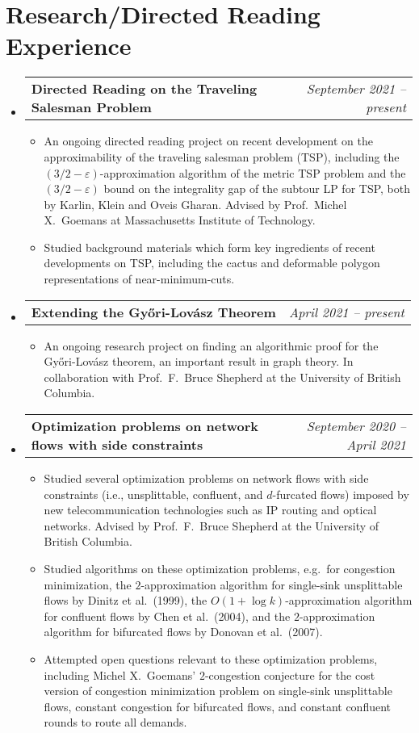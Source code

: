 \documentclass[letterpaper,11pt]{article}
\makeatletter
\newcommand{\researchItem}[1]{
  \item\small{#1 \vspace{-2pt}}
}
\newcommand{\researchExperience}[2]{
  \vspace{-1pt}\item
    \begin{tabular*}{0.97\textwidth}{l@{\extracolsep{\fill}}r}
      \textbf{#1} & \textit{\small #2}
    \end{tabular*}\vspace{-5pt}
}
\newcommand{\resumeSubHeadingListStart}{\begin{itemize}[leftmargin=*]}
\newcommand{\resumeSubHeadingListEnd}{\end{itemize}}
\newcommand{\resumeItemListStart}{\begin{itemize}}
\newcommand{\resumeItemListEnd}{\end{itemize}\vspace{-5pt}}
\makeatother
\begin{document}
\section{Research/Directed Reading Experience}
  \resumeSubHeadingListStart
    \researchExperience
    {Directed Reading on the Traveling Salesman Problem}{September 2021 -- present}
    \resumeItemListStart
        \researchItem{An ongoing directed reading project on recent development on the approximability of the traveling salesman problem (TSP), including the $(3/2 - \varepsilon)$-approximation algorithm of the metric TSP problem and the $(3/2 - \varepsilon)$ bound on the integrality gap of the subtour LP for TSP, both by Karlin, Klein and Oveis Gharan. Advised by Prof.\ Michel X.\ Goemans at Massachusetts Institute of Technology.}
        \researchItem{Studied background materials which form key ingredients of recent developments on TSP, including the cactus and deformable polygon representations of near-minimum-cuts.}
    \resumeItemListEnd
    \researchExperience
      {Extending the Gy\H{o}ri-Lov\'{a}sz Theorem}{April 2021 -- present}
      \resumeItemListStart
          \researchItem{An ongoing research project on finding an algorithmic proof for the Gy\H{o}ri-Lov\'{a}sz theorem, an important result in graph theory. In collaboration with Prof.\ F.\ Bruce Shepherd at the University of British Columbia.}
      \resumeItemListEnd
    \researchExperience
      {Optimization problems on network flows with side constraints}{September 2020 -- April 2021}
      \resumeItemListStart
        \researchItem{Studied several optimization problems on network flows with side constraints (i.e., unsplittable, confluent, and $d$-furcated flows) imposed by new telecommunication technologies such as IP routing and optical networks. Advised by Prof.\ F.\ Bruce Shepherd at the University of British Columbia.}
        \researchItem{Studied algorithms on these optimization problems, e.g.\ for congestion minimization, the $2$-approximation algorithm for single-sink unsplittable flows by Dinitz et al.\ (1999), the $O(1 + \log k)$-approximation algorithm for confluent flows by Chen et al.\ (2004), and the $2$-approximation algorithm for bifurcated flows by Donovan et al.\ (2007).}
        \researchItem{Attempted open questions relevant to these optimization problems, including Michel X.\ Goemans' $2$-congestion conjecture for the cost version of congestion minimization problem on single-sink unsplittable flows, constant congestion for bifurcated flows, and constant confluent rounds to route all demands.}
      \resumeItemListEnd
  \resumeSubHeadingListEnd
\end{document}
